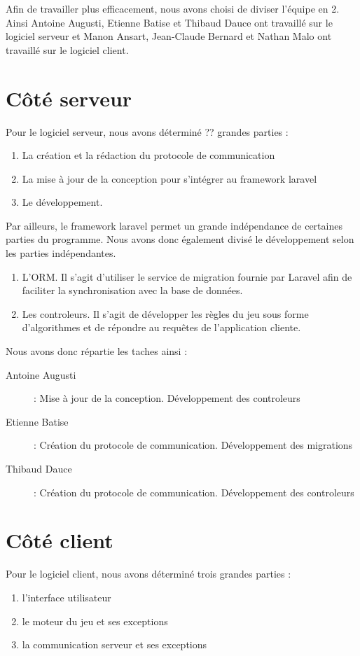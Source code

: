 Afin de travailler plus efficacement, nous avons choisi de diviser l'équipe en 2. Ainsi Antoine Augusti, Etienne Batise et Thibaud Dauce ont travaillé sur le logiciel serveur et Manon Ansart, Jean-Claude Bernard et Nathan Malo ont travaillé sur le logiciel client.\newline

\section{Côté serveur}
    Pour le logiciel serveur, nous avons déterminé ?? grandes parties :

	\begin{enumerate}
		\item La création et la rédaction du protocole de communication 
		\item La mise à jour de la conception pour s'intégrer au framework laravel
		\item Le développement.\newline
	\end{enumerate}

    Par ailleurs, le framework laravel permet un grande indépendance de certaines parties du programme. Nous avons donc également divisé le développement selon les parties indépendantes.
	\begin{enumerate}
		\item L'ORM. Il s'agit d'utiliser le service de migration fournie par Laravel afin de faciliter la synchronisation avec la base de données.
		\item Les controleurs. Il s'agit de développer les règles du jeu sous forme d'algorithmes et de répondre au requêtes de l'application cliente. \newline
	\end{enumerate}

    Nous avons donc répartie les taches ainsi :
	\begin{description}
        \item [Antoine Augusti] : Mise à jour de la conception. Développement des controleurs
		\item [Etienne Batise] : Création du protocole de communication. Développement des migrations
		\item [Thibaud Dauce] :  Création du protocole de communication. Développement des controleurs
	\end{description} 
    

\section{Côté client}
	Pour le logiciel client, nous avons déterminé trois grandes parties :
	\begin{enumerate}
		\item l'interface utilisateur
		\item le moteur du jeu et ses exceptions
		\item la communication serveur et ses exceptions
	\end{enumerate}

